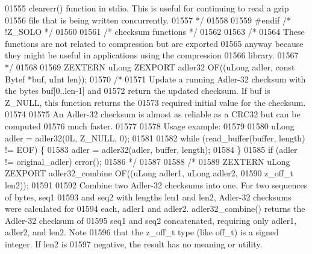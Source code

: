 \begin{DoxyCode}
01555 \textcolor{comment}{   clearerr() function in stdio.  This is useful for continuing to read a gzip}
01556 \textcolor{comment}{   file that is being written concurrently.}
01557 \textcolor{comment}{*/}
01558 
01559 \textcolor{preprocessor}{#endif }\textcolor{comment}{/* !Z\_SOLO */}\textcolor{preprocessor}{}
01560 
01561                         \textcolor{comment}{/* checksum functions */}
01562 
01563 \textcolor{comment}{/*}
01564 \textcolor{comment}{     These functions are not related to compression but are exported}
01565 \textcolor{comment}{   anyway because they might be useful in applications using the compression}
01566 \textcolor{comment}{   library.}
01567 \textcolor{comment}{*/}
01568 
01569 ZEXTERN uLong ZEXPORT adler32 OF((uLong adler, \textcolor{keyword}{const} Bytef *buf, uInt len));
01570 \textcolor{comment}{/*}
01571 \textcolor{comment}{     Update a running Adler-32 checksum with the bytes buf[0..len-1] and}
01572 \textcolor{comment}{   return the updated checksum.  If buf is Z\_NULL, this function returns the}
01573 \textcolor{comment}{   required initial value for the checksum.}
01574 \textcolor{comment}{}
01575 \textcolor{comment}{     An Adler-32 checksum is almost as reliable as a CRC32 but can be computed}
01576 \textcolor{comment}{   much faster.}
01577 \textcolor{comment}{}
01578 \textcolor{comment}{   Usage example:}
01579 \textcolor{comment}{}
01580 \textcolor{comment}{     uLong adler = adler32(0L, Z\_NULL, 0);}
01581 \textcolor{comment}{}
01582 \textcolor{comment}{     while (read\_buffer(buffer, length) != EOF) \{}
01583 \textcolor{comment}{       adler = adler32(adler, buffer, length);}
01584 \textcolor{comment}{     \}}
01585 \textcolor{comment}{     if (adler != original\_adler) error();}
01586 \textcolor{comment}{*/}
01587 
01588 \textcolor{comment}{/*}
01589 \textcolor{comment}{ZEXTERN uLong ZEXPORT adler32\_combine OF((uLong adler1, uLong adler2,}
01590 \textcolor{comment}{                                          z\_off\_t len2));}
01591 \textcolor{comment}{}
01592 \textcolor{comment}{     Combine two Adler-32 checksums into one.  For two sequences of bytes, seq1}
01593 \textcolor{comment}{   and seq2 with lengths len1 and len2, Adler-32 checksums were calculated for}
01594 \textcolor{comment}{   each, adler1 and adler2.  adler32\_combine() returns the Adler-32 checksum of}
01595 \textcolor{comment}{   seq1 and seq2 concatenated, requiring only adler1, adler2, and len2.  Note}
01596 \textcolor{comment}{   that the z\_off\_t type (like off\_t) is a signed integer.  If len2 is}
01597 \textcolor{comment}{   negative, the result has no meaning or utility.}

\end{DoxyCode}
